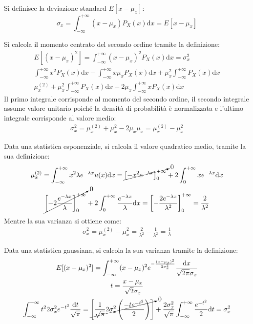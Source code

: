\documentclass{article}
\newcommand{\df}{\mathrm{d}}
\numberwithin{equation}{subsection}
\begin{document}
Si definisce la deviazione standard $E[x-\mu_x]$:
\begin{equation}
    \sigma_x=\displaystyle\int_{-\infty}^{+\infty}(x-\mu_x)P_X(x)\df x=E[x-\mu_x]
\end{equation}


Si calcola il momento centrato del secondo ordine tramite la definizione:
\begin{gather*}
    E\left[(x-\mu_x)^2\right]=\displaystyle\int_{-\infty}^{+\infty}(x-\mu_x)^2P_X(x)\df x=\sigma_x^2\\
    \int_{-\infty}^{+\infty}x^2P_X(x)\df x-\int_{-\infty}^{+\infty}x\mu_xP_X(x)\df x+\mu_x^2\int_{-\infty}^{+\infty}P_X(x)\df x\\
    \mu_x^{(2)}+\mu_x^2\int_{-\infty}^{+\infty}P_X(x)\df x-2\mu_x\int_{-\infty}^{+\infty}xP_X(x)\df x
\end{gather*}
Il primo integrale corrisponde al momento del secondo ordine, il secondo integrale assume valore unitario poiché la densità di probabilità è normalizzata e l'ultimo 
integrale corrisponde al valore medio:
\begin{gather*}
    \sigma_x^2=\mu_x^{(2)}+\mu_x^2-2\mu_x\mu_x=\mu_x^{(2)}-\mu_x^2
\end{gather*}

Data una statistica esponenziale, si calcola il valore quadratico medio, tramite la sua definizione:
\begin{gather*}
    \mu_x^{(2)}=\displaystyle\int_{-\infty}^{+\infty}x^2\lambda e^{-\lambda x}u(x)\df x=\cancelto{0}{\left[-x^2e^{-\lambda x}\right]_0^{+\infty}}+2\int_{0}^{+\infty}xe^{-\lambda x}\df x\\
    \cancelto{0}{\left[-2\displaystyle\frac{e^{-\lambda x}}{\lambda}\right]_0^{+\infty}}+2\int_{0}^{+\infty}\frac{e^{-\lambda x}}{\lambda}\df x=\left[-\frac{2e^{-\lambda x}}{\lambda^2}\right]^{+\infty}_0=\frac{2}{\lambda^2}
\end{gather*}
Mentre la sua varianza si ottiene come:
\begin{gather*}
    \sigma_x^2=\mu_x^{(2)}-\mu_x^2=\displaystyle\frac{2}{\lambda^2}-\frac{1}{\lambda^2}=\frac{1}{\lambda}
\end{gather*}


Data una statistica gaussiana, si calcola la sua varianza tramite la definizione:
\begin{gather*}
    E[(x-\mu_x)^2]=\displaystyle\int_{-\infty}^{+\infty}(x-\mu_x)^2e^{-\frac{(x-\mu_x)^2}{2\sigma_x^2}}\frac{\df x}{\sqrt{2\pi}\sigma_x}\\
    t=\displaystyle\frac{x-\mu_x}{\sqrt{2}\sigma_x}\\
    \displaystyle\int_{-\infty}^{+\infty}t^22\sigma_x^2e^{-t^2}\frac{\df t}{\sqrt{\pi}}=\cancelto{0}{\left[\frac{1}{\sqrt{\pi}}2\sigma_x^2\left(\frac{-te^{-t^2}}{2}\right)\right]}+\frac{2\sigma_x^2}{\sqrt{\pi}}\int_{-\infty}^{+\infty}\frac{e^{-t^2}}{2}\df t=\sigma_x^2
\end{gather*}
\end{document}
